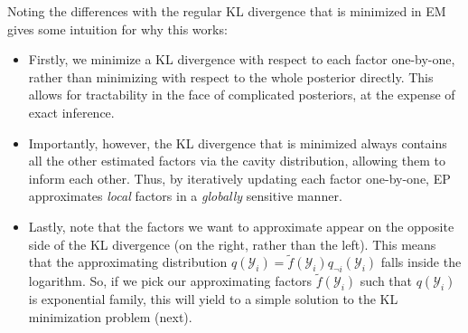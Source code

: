 \documentclass[a4paper]{article}
\begin{document}
Noting the differences with the regular KL divergence that is minimized in EM gives some intuition for why this works: 
\begin{itemize}
\item Firstly, we minimize a KL divergence with respect to each factor one-by-one, rather than minimizing with respect to the whole posterior directly. This allows for tractability in the face of complicated posteriors, at the expense of exact inference.
\item Importantly, however, the KL divergence that is minimized always contains all the other estimated factors via the cavity distribution, allowing them to inform each other. Thus, by iteratively updating each factor one-by-one, EP approximates \emph{local} factors in a \emph{globally} sensitive manner.
\item Lastly, note that the factors we want to approximate appear on the opposite side of the KL divergence (on the right, rather than the left). This means that the approximating distribution $q(\mathcal{Y}_i) = \tilde{f}(\mathcal{Y}_i)q_{\neg i}(\mathcal{Y}_i)$ falls inside the logarithm. So, if we pick our approximating factors $\tilde{f}(\mathcal{Y}_i)$ such that $q(\mathcal{Y}_i)$ is exponential family, this will yield to a simple solution to the KL minimization problem (next).
\end{itemize}
\end{document}
